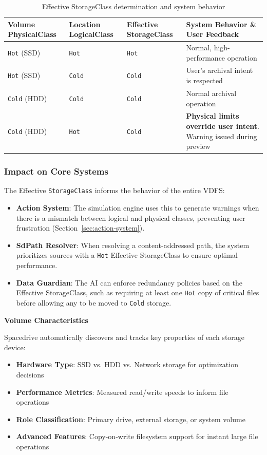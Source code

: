 \documentclass[sigconf]{acmart}
\begin{document}
\begin{table}[h]
\centering
\begin{tabular}{@{}lllp{2cm}@{}}
\toprule
\textbf{Volume PhysicalClass} & \textbf{Location LogicalClass} & \textbf{Effective StorageClass} & \textbf{System Behavior \& User Feedback} \\
\midrule
\texttt{Hot} (SSD) & \texttt{Hot} & \texttt{Hot} & Normal, high-performance operation \\
\texttt{Hot} (SSD) & \texttt{Cold} & \texttt{Cold} & User's archival intent is respected \\
\texttt{Cold} (HDD) & \texttt{Cold} & \texttt{Cold} & Normal archival operation \\
\texttt{Cold} (HDD) & \texttt{Hot} & \texttt{Cold} & \textbf{Physical limits override user intent}. Warning issued during preview \\
\bottomrule
\end{tabular}
\caption{Effective StorageClass determination and system behavior}
\label{tab:storage-class-resolution}
\end{table}

\subsubsection{Impact on Core Systems}
The Effective \texttt{StorageClass} informs the behavior of the entire VDFS:
\begin{itemize}[noitemsep, topsep=0pt]
 \item \textbf{Action System}: The simulation engine uses this to generate warnings when there is a mismatch between logical and physical classes, preventing user frustration (Section~\ref{sec:action-system}).
 \item \textbf{SdPath Resolver}: When resolving a content-addressed path, the system prioritizes sources with a \texttt{Hot} Effective StorageClass to ensure optimal performance.
 \item \textbf{Data Guardian}: The AI can enforce redundancy policies based on the Effective StorageClass, such as requiring at least one \texttt{Hot} copy of critical files before allowing any to be moved to \texttt{Cold} storage.
\end{itemize}


\textbf{Volume Characteristics}

Spacedrive automatically discovers and tracks key properties of each storage device:

\begin{itemize}[noitemsep, topsep=0pt]
 \item \textbf{Hardware Type}: SSD vs. HDD vs. Network storage for optimization decisions
 \item \textbf{Performance Metrics}: Measured read/write speeds to inform file operations
 \item \textbf{Role Classification}: Primary drive, external storage, or system volume
 \item \textbf{Advanced Features}: Copy-on-write filesystem support for instant large file operations
\end{itemize}
\end{document}
